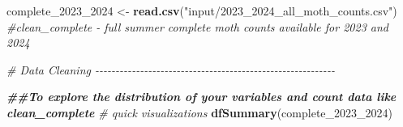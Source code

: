 \documentclass[
]{article}
\newenvironment{Shaded}{\begin{snugshade}}{\end{snugshade}}
\newcommand{\CommentTok}[1]{\textcolor[rgb]{0.56,0.35,0.01}{\textit{#1}}}
\newcommand{\DocumentationTok}[1]{\textcolor[rgb]{0.56,0.35,0.01}{\textbf{\textit{#1}}}}
\newcommand{\FunctionTok}[1]{\textcolor[rgb]{0.13,0.29,0.53}{\textbf{#1}}}
\newcommand{\NormalTok}[1]{#1}
\newcommand{\OtherTok}[1]{\textcolor[rgb]{0.56,0.35,0.01}{#1}}
\newcommand{\StringTok}[1]{\textcolor[rgb]{0.31,0.60,0.02}{#1}}
\begin{document}
\begin{Shaded}
\begin{Highlighting}[]
\NormalTok{complete\_2023\_2024 }\OtherTok{\textless{}{-}} \FunctionTok{read.csv}\NormalTok{(}\StringTok{"input/2023\_2024\_all\_moth\_counts.csv"}\NormalTok{)}
\CommentTok{\#clean\_complete {-} full summer complete moth counts available for 2023 and 2024}


\CommentTok{\# Data Cleaning {-}{-}{-}{-}{-}{-}{-}{-}{-}{-}{-}{-}{-}{-}{-}{-}{-}{-}{-}{-}{-}{-}{-}{-}{-}{-}{-}{-}{-}{-}{-}{-}{-}{-}{-}{-}{-}{-}{-}{-}{-}{-}{-}{-}{-}{-}{-}{-}{-}{-}{-}{-}{-}{-}{-}{-}{-}{-}{-}}


\DocumentationTok{\#\#To explore the distribution of your variables and count data like clean\_complete}
\CommentTok{\# quick visualizations}
\FunctionTok{dfSummary}\NormalTok{(complete\_2023\_2024)}
\end{Highlighting}
\end{Shaded}
\end{document}
